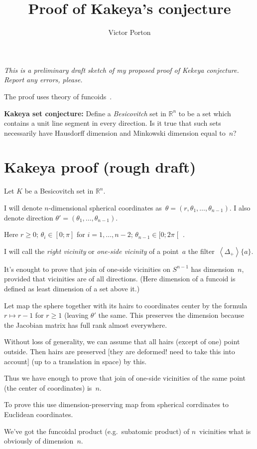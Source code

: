\documentclass{amsart}
\title{Proof of Kakeya's conjecture}
\author{Victor Porton}
\newcommand{\supfun}[1]{\left\langle#1\right\rangle}
\begin{document}
\maketitle  

\emph{This is a preliminary draft sketch of my proposed proof of Kekeya conjecture. Report any errors, please.}

The proof uses theory of funcoids~\cite{volume-1}.

\textbf{Kakeya set conjecture:} Define a \emph{Besicovitch} set in $\mathbb{R}^n$ to be a set which contains a unit line segment in every direction. Is it true that such sets necessarily have Hausdorff dimension and Minkowski dimension equal to~$n$?

\section{Kakeya proof (rough draft)}

Let $K$ be a Besicovitch set in $\mathbb{R}^n$.

I will denote $n$-dimensional spherical coordinates as~$\theta=(r, \theta_1,\dots,\theta_{n-1})$.
I also denote direction $\theta'=(\theta_1,\dots,\theta_{n-1})$.

Here $r\geq 0$; $\theta_i\in[0;\pi]$ for $i=1,\dots,n-2$; $\theta_{n-1}\in[0;2\pi\mathclose[$ .

I will call the \emph{right vicinity} or \emph{one-si\-de vicinity} of a point~$a$ the filter~$\supfun{\Delta_{+}}\{a\}$.

It's enought to prove that join of one-si\-de vicinities on $S^{n-1}$ has dimension~$n$, provided that vicinities are of all directions.
(Here dimension of a funcoid is defined as least dimension of a set above it.)

Let map the sphere together with its hairs to coordinates center by the formula $r\mapsto r-1$ for $r\geq 1$ (leaving $\theta'$ the same.
This preserves the dimension because the Jacobian matrix has full rank almost everywhere.

Without loss of generality, we can assume that all hairs (except of one) point outside. Then hairs are preserved [they are deformed! need to take this into account] (up to a translation in space) by this.

Thus we have enough to prove that join of one-si\-de vicinities of the same point (the center of coordinates) is~$n$.

To prove this use di\-men\-si\-on-pre\-ser\-ving map from spherical corrdinates to Euclidean coordinates.

We've got the funcoidal product (e.g.\ subatomic product) of $n$\ vicinities what is obviously of dimension~$n$.



\end{document}
